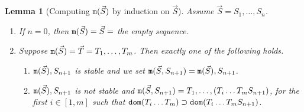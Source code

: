 \documentclass{lmcs}
\newtheorem{lemma}[theorem]{Lemma}
\begin{document}
\begin{lemma}[Computing ${\tt m}(\vec{S})$ by induction on $\vec{S}$]
\label{lemma-minstable.inductive}
Assume $\vec{S} = S_1, \ldots, S_n$. 
\begin{enumerate}
\item
If $n=0$, then ${\tt m}(\vec{S}) = \vec{S} = $ the empty sequence.
\item
Suppose ${\tt m}(\vec{S}) = \vec{T} = T_1, \ldots, T_m$. Then exactly
one of the following holds.
\begin{enumerate}
\item
${\tt m}(\vec{S}), S_{n+1}$ is stable and we set
${\tt m}(\vec{S}, S_{n+1}) = {\tt m}(\vec{S}), S_{n+1}$.
\item
${\tt m}(\vec{S}), S_{n+1}$ is \emph{not} stable and
${\tt m}(\vec{S}, S_{n+1}) = T_1, \ldots, (T_i \ldots T_m S_{n+1})$, 
for the first $i \in [1,m]$ such that 
${\tt dom}(T_i \ldots T_m) \supset {\tt dom}(T_i \ldots T_m S_{n+1})$.
\end{enumerate}
\end{enumerate}
\end{lemma}
\end{document}

